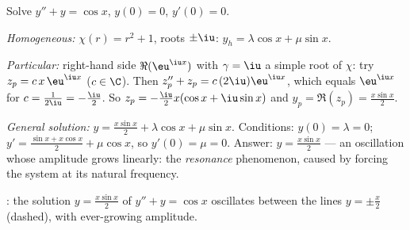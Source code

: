 \begin{example}\label{ex:b1:diffeq:oscillation}
Solve $y'' + y = \cos x$, $y(0) = 0$, $y'(0) = 0$.

\emph{Homogeneous:} $\chi(r) = r^2 + 1$, roots $\pm\iu$: $y_h =
\lambda\cos x + \mu \sin x$.

\emph{Particular:} right-hand side $\Re(\eu^{\iu x})$ with $\gamma =
\iu$ a simple root of $\chi$: try $z_p = c\, x\, \eu^{\iu x}$
($c \in \C$). Then $z_p'' + z_p = c\,(2\iu)\eu^{\iu x}$, which equals
$\eu^{\iu x}$ for $c = \frac{1}{2\iu} = -\frac\iu2$. So $z_p =
-\frac{\iu}{2} x (\cos x + \iu \sin x)$ and $y_p = \Re(z_p) =
\frac{x \sin x}{2}$.

\emph{General solution:} $y = \frac{x\sin x}{2} + \lambda\cos x +
\mu\sin x$. Conditions: $y(0) = \lambda = 0$; $y' = \frac{\sin x +
x\cos x}{2} + \mu\cos x$, so $y'(0) = \mu = 0$. Answer: $y =
\frac{x\sin x}{2}$ --- an oscillation whose amplitude grows linearly:
the \emph{resonance} phenomenon, caused by forcing
the system at its natural frequency.
\end{example}

\begin{omfigure}

{\small {}: the solution $y = \frac{x \sin x}{2}$ of $y'' + y =
\cos x$ oscillates between the lines $y = \pm\frac x2$ (dashed), with
ever-growing amplitude.}
\end{omfigure}

